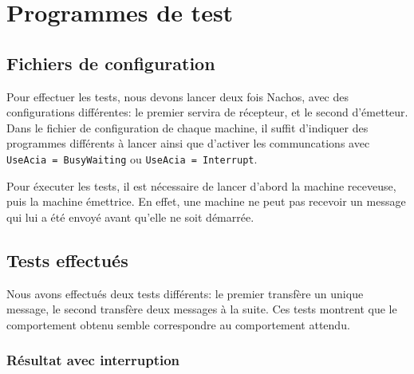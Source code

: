 \documentclass{article}
\begin{document}
\section{Programmes de test}
\subsection{Fichiers de configuration}
Pour effectuer les tests, nous devons lancer deux fois Nachos, avec des configurations différentes: le premier servira de récepteur, et le second d'émetteur. Dans le fichier de configuration de chaque machine, il suffit d'indiquer des programmes différents à lancer ainsi que d'activer les communcations avec \texttt{UseAcia = BusyWaiting} ou \texttt{UseAcia = Interrupt}.

Pour éxecuter les tests, il est nécessaire de lancer d'abord la machine receveuse, puis la machine émettrice. En effet, une machine ne peut pas recevoir un message qui lui a été envoyé avant qu'elle ne soit démarrée.

\subsection{Tests effectués}
Nous avons effectués deux tests différents: le premier transfère un unique message, le second transfère deux messages à la suite. Ces tests montrent que le comportement obtenu semble correspondre au comportement attendu.

\subsubsection{Résultat avec interruption}
\end{document}
